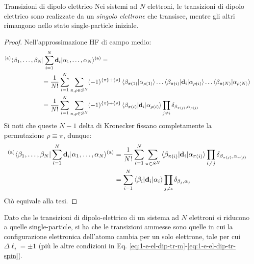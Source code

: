 \begin{proposition}{Transizioni di dipolo elettrico}{}
	Nei sistemi ad $ N $ elettroni, le transizioni di dipolo elettrico sono realizzate da un \textit{singolo elettrone} che transisce, mentre gli altri rimangono nello stato single-particle iniziale.

	\tcblower

	\begin{proof}
		Nell'approssimazione HF di campo medio:
		\begin{equation*}
			\begin{split}
				& {^\text{(a)}\langle} \beta_1, \dots, \beta_N | \sum_{i = 1}^{N} \mathbf{d}_i | \alpha_1, \dots, \alpha_N {\rangle^\text{(a)}} = \\
				& \qquad \qquad \qquad = \frac{1}{N!} \sum_{i = 1}^{N} \sum_{\pi,\rho \in S^N} (-1)^{\{\pi\} + \{\rho\}} \braket{\beta_{\pi(1)} | \alpha_{\rho(1)}} \dots \braket{\beta_{\pi(i)} | \mathbf{d}_i | \alpha_{\rho(i)}} \dots \braket{\beta_{\pi(N)} | \alpha_{\rho(N)}} \\
				& \qquad \qquad \qquad = \frac{1}{N!} \sum_{i = 1}^{N} \sum_{\pi,\rho \in S^N} (-1)^{\{\pi\} + \{\rho\}} \braket{\beta_{\pi(i)} | \mathbf{d}_i | \alpha_{\rho(i)}} \prod_{j \neq i} \delta_{\beta_{\pi(j)} , \alpha_{\rho(j)}}
			\end{split}
		\end{equation*}
		Si noti che queste $ N - 1 $ delta di Kronecker fissano completamente la permutazione $ \rho \equiv \pi $, dunque:
		\begin{equation*}
			\begin{split}
				{^\text{(a)}\langle} \beta_1, \dots, \beta_N | \sum_{i = 1}^{N} \mathbf{d}_i | \alpha_1, \dots, \alpha_N {\rangle^\text{(a)}}
				& = \frac{1}{N!} \sum_{i = 1}^{N} \sum_{\pi \in S^N} \braket{\beta_{\pi(i)} | \mathbf{d}_i | \alpha_{\pi(i)}} \prod_{i \neq j} \delta_{\beta_{\pi(j)} , \alpha_{\pi(j)}} \\
				& = \sum_{i = 1}^{N} \braket{\beta_i | \mathbf{d}_i | \alpha_i} \prod_{j \neq i} \delta_{\beta_j , \alpha_j}
			\end{split}
		\end{equation*}
		Ciò equivale alla tesi.
	\end{proof}
\end{proposition}

Dato che le transizioni di dipolo-elettrico di un sistema ad $ N $ elettroni si riducono a quelle single-particle, si ha che le transizioni ammesse sono quelle in cui la configurazione elettronica dell'atomo cambia per un solo elettrone, tale per cui $ \Delta \ell_i = \pm 1 $ (più le altre condizioni in Eq. \ref{eq:1-e-el-dip-tr-m}-\ref{eq:1-e-el-dip-tr-spin}).

